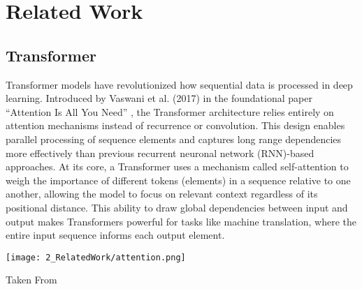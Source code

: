 \chapter{Related Work} %

\label{related_work} %

\section{Transformer}
\label{sec:rel_transformer}

Transformer models have revolutionized how sequential data is processed in deep learning. 
Introduced by Vaswani et al. (2017) in the foundational paper “Attention Is All You Need” 
\cite{attention}
, the Transformer architecture relies entirely on attention mechanisms instead of recurrence or convolution.
This design enables parallel processing of sequence elements and captures long range dependencies 
more effectively than previous recurrent neuronal network (RNN)-based approaches. 
At its core, a Transformer uses a mechanism called self-attention to weigh the importance of different 
tokens (elements) in a sequence relative to one another, 
allowing the model to focus on relevant context regardless of its positional distance. 
This ability to draw global dependencies between input and output makes Transformers powerful 
for tasks like machine translation, where the entire input sequence informs each output element. 

\begin{marginfigure}[] %
    \texttt{[image: 2\_RelatedWork/attention.png]}
    \caption{\label{fig:malratios}
    Taken From \cite{attention}}
\end{marginfigure}

